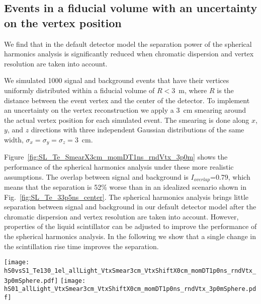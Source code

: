 \subsection{Events in a fiducial volume with an uncertainty on the vertex position}
We find that in the default detector model the separation power of
the spherical harmonics analysis is significantly reduced when chromatic
dispersion and vertex resolution are taken into account.

We simulated 1000 signal and background events that have their
vertices uniformly distributed within a fiducial volume of $R<3$~m,
where $R$ is the distance between the event vertex and the center of
the detector. To implement an uncertainty on the vertex reconstruction
we apply a 3~cm smearing around the actual vertex position for each
simulated event. The smearing is done along $x$, $y$, and $z$
directions with three independent Gaussian distributions of the same
width, $\sigma_x = \sigma_y = \sigma_z =$3~cm.

Figure~\ref{fig:SL_Te_SmearX3cm_momDT1ns_rndVtx_3p0m} shows the
performance of the spherical harmonics analysis under these more
realistic assumptions. The overlap between signal and background is
$I_{overlap}$=0.79, which means that the separation is 52\% worse than
in an idealized scenario shown in Fig.~\ref{fig:SL_Te_33p5ns_center}.
The spherical harmonics analysis brings little separation between
signal and background in our default detector model after the
chromatic dispersion and vertex resolution are taken into
account. However, properties of the liquid scintillator can be
adjusted to improve the performance of the spherical harmonics
analysis. In the following we show that a single change in the
scintillation rise time improves the separation.



\begin{figure*}[h]
  \centering
  \texttt{[image: hS0vsS1\_Te130\_1el\_allLight\_VtxSmear3cm\_VtxShiftX0cm\_momDT1p0ns\_rndVtx\_3p0mSphere.pdf]}
  \texttt{[image: hS01\_allLight\_VtxSmear3cm\_VtxShiftX0cm\_momDT1p0ns\_rndVtx\_3p0mSphere.pdf]}
  \caption{\emph{Left:} Scatter plot of $S_0$ versus $S_1$ for a
    simulation of 1000 signal (\emph{red crosses}) and background
    (\emph{blue triangles}) events. Event vertices are uniformly
    distributed within the fiducial volume, $R<3$~m.  The vertex is
    smeared with 3~cm resolution. A differential cut of $\Delta
    t=t^{phot}_{measured} - t^{phot}_{predicted}<$1~ns is applied to
    select the early PE sample.  The default QE and xx\% photo-coverage
    are used in the simulation.  The black dashed line corresponds to a
    linear fit to define the 1-D variable $S_{01}$.
    \emph{Right:} A comparison of the $S_{01}$ distribution between
    signal (\emph{red solid line}) and background (\emph{blue dashed
    line}).  $I_{overlap}$=0.79.}
\label{fig:SL_Te_SmearX3cm_momDT1ns_rndVtx_3p0m}
\end{figure*}

